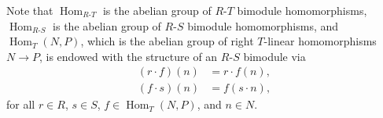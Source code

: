 \begin{theorem}
\begin{enumerate}
        Note that $\operatorname{Hom}_{R\text{-}T}$ is the abelian group of $R$-$T$ bimodule homomorphisms, $\operatorname{Hom}_{R\text{-}S}$ is the abelian group of $R$-$S$ bimodule homomorphisms, and $\operatorname{Hom}_T(N,P)$, which is the abelian group of right $T$-linear homomorphisms $N \to P$, is endowed with the structure of an $R$-$S$ bimodule via
        \begin{align*}
        (r \cdot f)(n) &= r \cdot f(n), \\
        (f \cdot s)(n) &= f(s \cdot n),
        \end{align*}
        for all $r \in R$, $s \in S$, $f \in \operatorname{Hom}_T(N,P)$, and $n \in N$.


    \end{enumerate}
\end{theorem}

